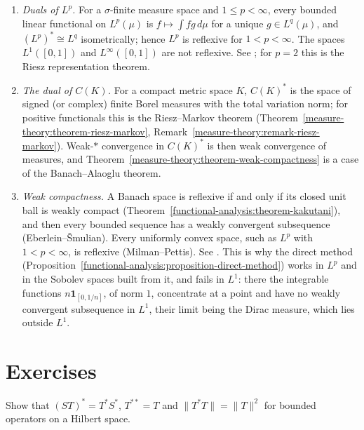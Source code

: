 \begin{remark}\label{functional-analysis:remark-reflexive}
\begin{enumerate}
\item \emph{Duals of $L^p$.} For a $\sigma$-finite measure space and $1 \leq p < \infty$, every bounded linear functional on $L^p(\mu)$ is $f \mapsto \int fg\,d\mu$ for a unique $g \in L^q(\mu)$, and
$(L^p)^* \cong L^q$ isometrically; hence $L^p$ is reflexive for $1 < p < \infty$. The spaces $L^1([0, 1])$ and $L^\infty([0, 1])$ are not reflexive. See \cite[Chapter 4]{brezis-functional}; for $p = 2$ this is the
Riesz representation theorem.
\item \emph{The dual of $C(K)$.} For a compact metric space $K$, $C(K)^*$ is the space of signed (or complex) finite Borel measures with the total variation norm; for positive functionals this is the
Riesz--Markov theorem (Theorem~\ref{measure-theory:theorem-riesz-markov}, Remark~\ref{measure-theory:remark-riesz-markov}). Weak-$*$ convergence in $C(K)^*$ is then weak convergence of measures, and
Theorem~\ref{measure-theory:theorem-weak-compactness} is a case of the Banach--Alaoglu theorem.
\item \emph{Weak compactness.} A Banach space is reflexive if and only if its closed unit ball is weakly compact (Theorem~\ref{functional-analysis:theorem-kakutani}), and then every bounded sequence has a weakly convergent subsequence
(Eberlein--\v{S}mulian). Every uniformly convex space, such as $L^p$ with $1 < p < \infty$, is reflexive (Milman--Pettis). See \cite[Chapter 3]{brezis-functional}. This is why the direct method
(Proposition~\ref{functional-analysis:proposition-direct-method}) works in $L^p$ and in the Sobolev spaces built from it, and fails in $L^1$: there the integrable functions $n\mathbf{1}_{[0, 1/n]}$, of norm $1$,
concentrate at a point and have no weakly convergent subsequence in $L^1$, their limit being the Dirac measure, which lies outside $L^1$.
\end{enumerate}
\end{remark}

\section{Exercises}\label{functional-analysis:section-exercises}

\begin{exercise}\label{functional-analysis:exercise-adjoint-properties}
Show that $(ST)^* = T^*S^*$, $T^{**} = T$ and $\|T^*T\| = \|T\|^2$ for bounded operators on a Hilbert space.
\end{exercise}

